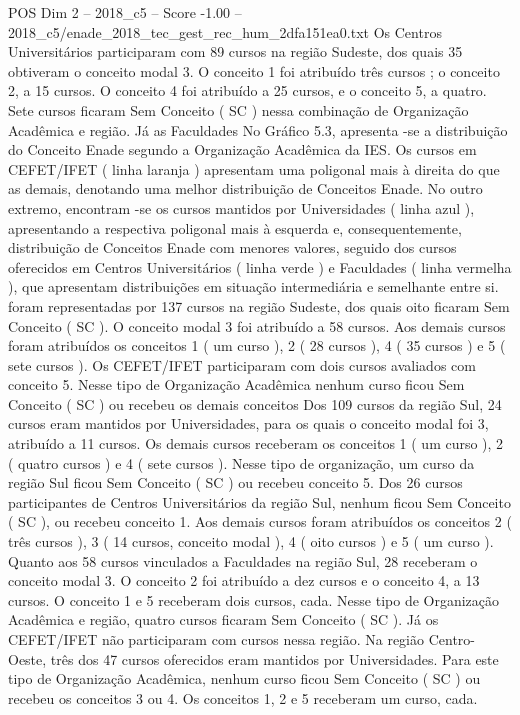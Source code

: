 \begin{textsample}{POS Dim 2 – 2018\_c5 – Score -1.00 – 2018\_c5/enade\_2018\_tec\_gest\_rec\_hum\_2dfa151ea0.txt}
Os Centros Universitários participaram com 89 cursos na região Sudeste, dos quais 35 obtiveram o conceito modal 3.
O conceito 1 foi atribuído três cursos ; o conceito 2, a 15 cursos.
O conceito 4 foi atribuído a 25 cursos, e o conceito 5, a quatro.
Sete cursos ficaram Sem Conceito ( SC ) nessa combinação de Organização Acadêmica e região.
Já as Faculdades No Gráfico 5.3, apresenta -se a distribuição do Conceito Enade segundo a Organização Acadêmica da IES.
Os cursos em CEFET/IFET ( linha laranja ) apresentam uma poligonal mais à direita do que as demais, denotando uma melhor distribuição de Conceitos Enade.
No outro extremo, encontram -se os cursos mantidos por Universidades ( linha azul ), apresentando a respectiva poligonal mais à esquerda e, consequentemente, distribuição de Conceitos Enade com menores valores, seguido dos cursos oferecidos em Centros Universitários ( linha verde ) e Faculdades ( linha vermelha ), que apresentam distribuições em situação intermediária e semelhante entre si. foram representadas por 137 cursos na região Sudeste, dos quais oito ficaram Sem Conceito ( SC ).
O conceito modal 3 foi atribuído a 58 cursos.
Aos demais cursos foram atribuídos os conceitos 1 ( um curso ), 2 ( 28 cursos ), 4 ( 35 cursos ) e 5 ( sete cursos ).
Os CEFET/IFET participaram com dois cursos avaliados com conceito 5.
Nesse tipo de Organização Acadêmica nenhum curso ficou Sem Conceito ( SC ) ou recebeu os demais conceitos Dos 109 cursos da região Sul, 24 cursos eram mantidos por Universidades, para os quais o conceito modal foi 3, atribuído a 11 cursos.
Os demais cursos receberam os conceitos 1 ( um curso ), 2 ( quatro cursos ) e 4 ( sete cursos ).
Nesse tipo de organização, um curso da região Sul ficou Sem Conceito ( SC ) ou recebeu conceito 5.
Dos 26 cursos participantes de Centros Universitários da região Sul, nenhum ficou Sem Conceito ( SC ), ou recebeu conceito 1.
Aos demais cursos foram atribuídos os conceitos 2 ( três cursos ), 3 ( 14 cursos, conceito modal ), 4 ( oito cursos ) e 5 ( um curso ).
Quanto aos 58 cursos vinculados a Faculdades na região Sul, 28 receberam o conceito modal 3.
O conceito 2 foi atribuído a dez cursos e o conceito 4, a 13 cursos.
O conceito 1 e 5 receberam dois cursos, cada.
Nesse tipo de Organização Acadêmica e região, quatro cursos ficaram Sem Conceito ( SC ).
Já os CEFET/IFET não participaram com cursos nessa região.
Na região Centro-Oeste, três dos 47 cursos oferecidos eram mantidos por Universidades.
Para este tipo de Organização Acadêmica, nenhum curso ficou Sem Conceito ( SC ) ou recebeu os conceitos 3 ou 4.
Os conceitos 1, 2 e 5 receberam um curso, cada.

\end{textsample}
